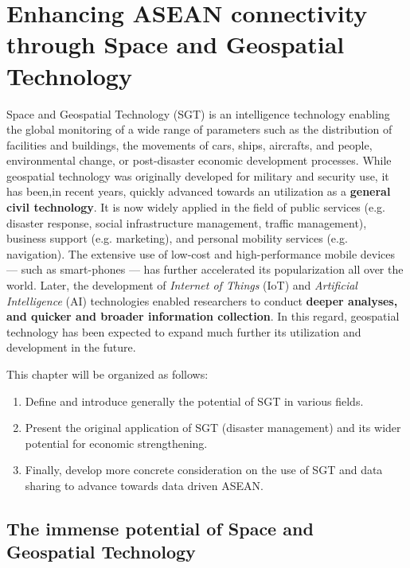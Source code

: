 \chapter{Enhancing ASEAN connectivity through Space and Geospatial Technology} \label{enhancing}

\tab Space and Geospatial Technology (SGT) is an intelligence technology enabling the global monitoring of a wide range of parameters such as the distribution of facilities and buildings, the movements of cars, ships, aircrafts, and people, environmental change, or post-disaster economic development processes. While geospatial technology was originally developed for military and security use, it has been,in recent years, quickly advanced towards an utilization as a \textbf{general civil technology}. It is now widely applied in the field of public services (e.g. disaster response, social infrastructure management, traffic management), business support (e.g. marketing), and personal mobility services (e.g. navigation). The extensive use of low-cost and high-performance mobile devices --- such as smart-phones --- has further accelerated its popularization all over the world. Later, the development of \textit{Internet of Things} (IoT) and \textit{Artificial Intelligence} (AI) technologies enabled researchers to conduct \textbf{deeper analyses, and quicker and broader information collection}. In this regard, geospatial technology has been expected to expand much further its utilization and development in the future.

\vspace{0.4 cm}

This chapter will be organized as follows:

\begin{enumerate}

\item Define and introduce generally the potential of SGT in various fields.

\item Present the original application of SGT (disaster management) and its wider potential for economic strengthening.

\item Finally, develop more concrete consideration on the use of SGT and data sharing to advance towards data driven ASEAN.

\end{enumerate}


\section{The immense potential of Space and Geospatial Technology}

